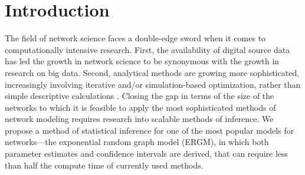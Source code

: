 \documentclass{llncs}
\begin{document}
\section{Introduction}
The field of network science faces a double-edge sword when it comes to computationally intensive research. First, the availability of digital source data has led the growth in network science to be synonymous with the growth in research on big data. %
Second, analytical methods are growing more sophisticated, increasingly involving iterative and/or simulation-based optimization, rather than simple descriptive calculations \cite{snijders2011statistical}.  Closing the gap in terms of the size of the networks to which it is feasible to apply the most sophisticated methods of network modeling requires research into scalable methods of inference. We propose a method of statistical inference for one of the most popular models for networks---the exponential random graph model (ERGM), in which both parameter estimates and confidence intervals are derived, that can require less than half the compute time of currently used methods. 
\end{document}
